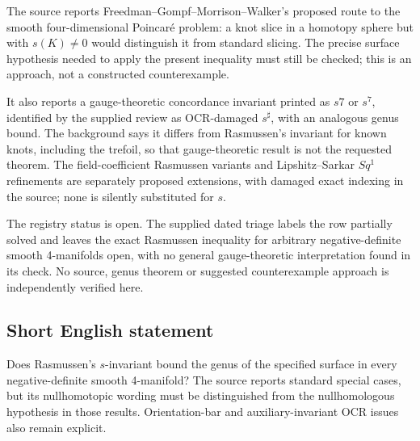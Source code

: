 \documentclass[11pt]{article}
\begin{document}
The source reports Freedman--Gompf--Morrison--Walker's proposed route to the smooth four-dimensional Poincar\'e problem: a knot slice in a homotopy sphere but with \(s(K)\ne0\) would distinguish it from standard slicing. The precise surface hypothesis needed to apply the present inequality must still be checked; this is an approach, not a constructed counterexample.

It also reports a gauge-theoretic concordance invariant printed as \(s7\) or \(s^7\), identified by the supplied review as OCR-damaged \(s^\sharp\), with an analogous genus bound. The background says it differs from Rasmussen's invariant for known knots, including the trefoil, so that gauge-theoretic result is not the requested theorem. The field-coefficient Rasmussen variants and Lipshitz--Sarkar \(Sq^1\) refinements are separately proposed extensions, with damaged exact indexing in the source; none is silently substituted for \(s\).

The registry status is open. The supplied dated triage labels the row partially solved and leaves the exact Rasmussen inequality for arbitrary negative-definite smooth 4-manifolds open, with no general gauge-theoretic interpretation found in its check. No source, genus theorem or suggested counterexample approach is independently verified here.
\subsection{Short English statement}
Does Rasmussen's \(s\)-invariant bound the genus of the specified surface in every negative-definite smooth 4-manifold? The source reports standard special cases, but its nullhomotopic wording must be distinguished from the nullhomologous hypothesis in those results. Orientation-bar and auxiliary-invariant OCR issues also remain explicit.
\end{document}
